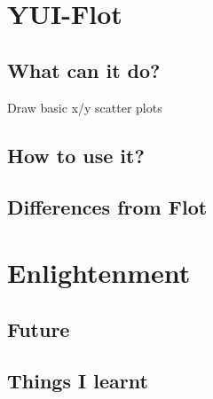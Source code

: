 \documentclass{beamer}
\begin{document}
\section{YUI-Flot}
\subsection{What can it do?}

\begin{frame}{Draw basic x/y scatter plots}
\end{frame}


\subsection{How to use it?}

\subsection{Differences from Flot}

\section{Enlightenment}
\subsection{Future}

\subsection{Things I learnt}
\end{document}
